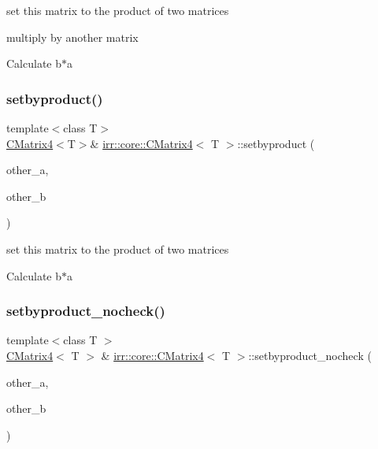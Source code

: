 set this matrix to the product of two matrices 

multiply by another matrix

Calculate b$\ast$a \mbox{\label{classirr_1_1core_1_1CMatrix4_a8d2978907b0c746092e4c9891cf72893}} 
\subsubsection{\texorpdfstring{setbyproduct()}{setbyproduct()}\hspace{0.1cm}{\footnotesize\ttfamily [2/2]}}
{\footnotesize\ttfamily template$<$class T$>$ \\
\hyperlink{classirr_1_1core_1_1CMatrix4}{C\+Matrix4}$<$T$>$\& \hyperlink{classirr_1_1core_1_1CMatrix4}{irr\+::core\+::\+C\+Matrix4}$<$ T $>$\+::setbyproduct (\begin{DoxyParamCaption}\item[{const \hyperlink{classirr_1_1core_1_1CMatrix4}{C\+Matrix4}$<$ T $>$ \&}]{other\+\_\+a,  }\item[{const \hyperlink{classirr_1_1core_1_1CMatrix4}{C\+Matrix4}$<$ T $>$ \&}]{other\+\_\+b }\end{DoxyParamCaption})\hspace{0.3cm}{\ttfamily [inline]}}



set this matrix to the product of two matrices 

Calculate b$\ast$a \mbox{\label{classirr_1_1core_1_1CMatrix4_a526a2a11dcd8b18c9e77deb84094778d}} 
\subsubsection{\texorpdfstring{setbyproduct\+\_\+nocheck()}{setbyproduct\_nocheck()}\hspace{0.1cm}{\footnotesize\ttfamily [1/2]}}
{\footnotesize\ttfamily template$<$class T $>$ \\
\hyperlink{classirr_1_1core_1_1CMatrix4}{C\+Matrix4}$<$ T $>$ \& \hyperlink{classirr_1_1core_1_1CMatrix4}{irr\+::core\+::\+C\+Matrix4}$<$ T $>$\+::setbyproduct\+\_\+nocheck (\begin{DoxyParamCaption}\item[{const \hyperlink{classirr_1_1core_1_1CMatrix4}{C\+Matrix4}$<$ T $>$ \&}]{other\+\_\+a,  }\item[{const \hyperlink{classirr_1_1core_1_1CMatrix4}{C\+Matrix4}$<$ T $>$ \&}]{other\+\_\+b }\end{DoxyParamCaption})\hspace{0.3cm}{\ttfamily [inline]}}



